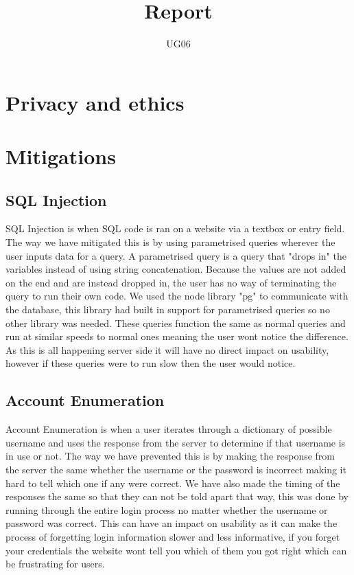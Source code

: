 \documentclass{cmpstyle}
\title{Report}
\author{UG06}
\begin{document}
	
\section{Privacy and ethics}

\section{Mitigations}

\subsection{SQL Injection}
SQL Injection is when SQL code is ran on a website via a textbox or entry field. The way we have mitigated this is by using parametrised queries wherever the user inputs data for a query. A parametrised query is a query that "drops in" the variables instead of using string concatenation. Because the values are not added on the end and are instead dropped in, the user has no way of terminating the query to run their own code. We used the node library "pg" to communicate with the database, this library had built in support for parametrised queries so no other library was needed. These queries function the same as normal queries and run at similar speeds to normal ones meaning the user wont notice the difference. As this is all happening server side it will have no direct impact on usability, however if these queries were to run slow then the user would notice.
\subsection{Account Enumeration}
Account Enumeration is when a user iterates through a dictionary of possible username and uses the response from the server to determine if that username is in use or not. The way we have prevented this is by making the response from the server the same whether the username or the password is incorrect making it hard to tell which one if any were correct. We have also made the timing of the responses the same so that they can not be told apart that way, this was done by running through the entire login process no matter whether the username or password was correct. This can have an impact on usability as it can make the process of forgetting login information slower and less informative, if you forget your credentials the website wont tell you which of them you got right which can be frustrating for users.
\end{document}
